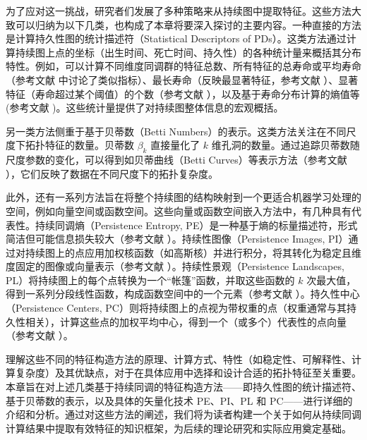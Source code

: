 为了应对这一挑战，研究者们发展了多种策略来从持续图中提取特征。这些方法大致可以归纳为以下几类，也构成了本章将要深入探讨的主要内容。一种直接的方法是计算持久性图的统计描述符（Statistical Descriptors of PDs）。这类方法通过计算持续图上点的坐标（出生时间、死亡时间、持久性）的各种统计量来概括其分布特性。例如，可以计算不同维度同调群的特征总数、所有特征的总寿命或平均寿命（参考文献 \cite{source:371, source:374, source:376} 中讨论了类似指标）、最长寿命（反映最显著特征，参考文献 \cite{source:379}）、显著特征（寿命超过某个阈值）的个数（参考文献 \cite{source:381}），以及基于寿命分布计算的熵值等 (参考文献 \cite{source:371, source:384})。这些统计量提供了对持续图整体信息的宏观概括。

另一类方法侧重于基于贝蒂数（Betti Numbers）的表示。这类方法关注在不同尺度下拓扑特征的数量。贝蒂数 $\beta_k$ 直接量化了 $k$ 维孔洞的数量。通过追踪贝蒂数随尺度参数的变化，可以得到如贝蒂曲线（Betti Curves）等表示方法（参考文献 \cite{source:59}），它们反映了数据在不同尺度下的拓扑复杂度。

此外，还有一系列方法旨在将整个持续图的结构映射到一个更适合机器学习处理的空间，例如向量空间或函数空间。这些向量或函数空间嵌入方法中，有几种具有代表性。持续同调熵（Persistence Entropy, PE）是一种基于熵的标量描述符，形式简洁但可能信息损失较大（参考文献 \cite{source:59, source:88, source:386}）。持续性图像（Persistence Images, PI）通过对持续图上的点应用加权核函数（如高斯核）并进行积分，将其转化为稳定且维度固定的图像或向量表示（参考文献 \cite{source:17, source:29, source:88, source:334, source:370, source:527}）。持续性景观（Persistence Landscapes, PL）将持续图上的每个点转换为一个“帐篷”函数，并取这些函数的 $k$ 次最大值，得到一系列分段线性函数，构成函数空间中的一个元素（参考文献 \cite{source:16, source:334, source:368, source:527}）。持久性中心（Persistence Centers, PC）则将持续图上的点视为带权重的点（权重通常与其持久性相关），计算这些点的加权平均中心，得到一个（或多个）代表性的点向量（参考文献 \cite{source:528, source:531}）。

理解这些不同的特征构造方法的原理、计算方式、特性（如稳定性、可解释性、计算复杂度）及其优缺点，对于在具体应用中选择和设计合适的拓扑特征至关重要。本章旨在对上述几类基于持续同调的特征构造方法——即持久性图的统计描述符、基于贝蒂数的表示，以及具体的矢量化技术 PE、PI、PL 和 PC——进行详细的介绍和分析。通过对这些方法的阐述，我们将为读者构建一个关于如何从持续同调计算结果中提取有效特征的知识框架，为后续的理论研究和实际应用奠定基础。

